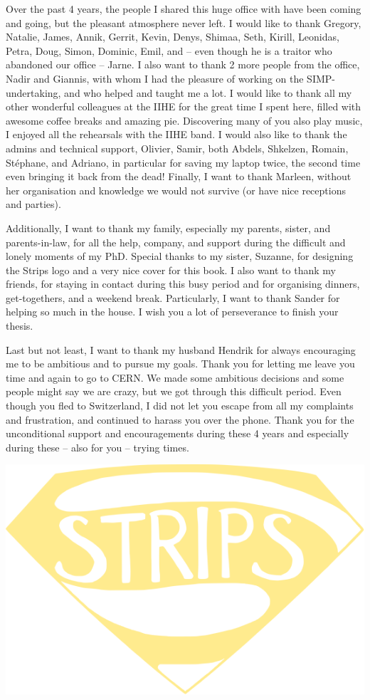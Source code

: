 Over the past 4 years, the people I shared this huge office with have been coming and going, but the pleasant atmosphere never left. I would like to thank Gregory, Natalie, James, Annik, Gerrit, Kevin, Denys, Shimaa, Seth, Kirill, Leonidas, Petra, Doug, Simon, Dominic, Emil, and -- even though he is a traitor who abandoned our office -- Jarne. I also want to thank 2 more people from the office, Nadir and Giannis, with whom I had the pleasure of working on the SIMP-undertaking, and who helped and taught me a lot. I would like to thank all my other wonderful colleagues at the IIHE for the great time I spent here, filled with awesome coffee breaks and amazing pie. Discovering many of you also play music, I enjoyed all the rehearsals with the IIHE band. I would also like to thank the admins and technical support, Olivier, Samir, both Abdels, Shkelzen, Romain, St\'ephane, and Adriano, in particular for saving my laptop twice, the second time even bringing it back from the dead! Finally, I want to thank Marleen, without her organisation and knowledge we would not survive (or have nice receptions and parties).

Additionally, I want to thank my family, especially my parents, sister, and parents-in-law, for all the help, company, and support during the difficult and lonely moments of my PhD. Special thanks to my sister, Suzanne, for designing the Strips logo and a very nice cover for this book. I also want to thank my friends, for staying in contact during this busy period and for organising dinners, get-togethers, and a weekend break. Particularly, I want to thank Sander for helping so much in the house. I wish you a lot of perseverance to finish your thesis.

Last but not least, I want to thank my husband Hendrik for always encouraging me to be ambitious and to pursue my goals. Thank you for letting me leave you time and again to go to CERN. We made some ambitious decisions and some people might say we are crazy, but we got through this difficult period. Even though you fled to Switzerland, I did not let you escape from all my complaints and frustration, and continued to harass you over the phone. Thank you for the unconditional support and encouragements during these 4 years and especially during these -- also for you -- trying times.

\vspace{3cm}

\begin{center}
 \includegraphics[width=.8\textwidth]{stripslogo}
\end{center}

